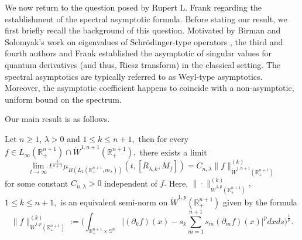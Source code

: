 \documentclass[12pt]{amsart}
\begin{document}
We now return to the question posed by Rupert L. Frank regarding the establishment of the spectral asymptotic formula. Before stating our result, we first briefly recall the background of this question. Motivated by Birman and Solomyak's work on eigenvalues of Schr\"{o}dinger-type operators \cite{MR1192782,MR279638}, the third and fourth authors and Frank \cite{FSZ} established the asymptotic of singular values for quantum derivatives (and thus, Riesz transform) in the classical setting. The spectral asymptotics are typically referred to as Weyl-type asymptotics. Moreover, the asymptotic coefficient happens to coincide with a non-asymptotic, uniform bound on the spectrum.

Our  main result is as follows.
\begin{theorem}\label{mtc} Let $n\geq1$, $\lambda>0$ and $1\leq k\leq n+1,$ then for every $f\in L_{\infty}(\mathbb{R}^{n+1}_+)\cap\dot{W}^{1,n+1}(\mathbb{R}^{n+1}_+),$ there exists a limit
$$\lim_{t\to\infty}t^{\frac1{n+1}}\mu_{B(L_2(\mathbb{R}^{n+1}_+,m_{\lambda}))}(t,[R_{\lambda,k},M_f])=C_{n,\lambda}\|f\|_{\dot{W}^{1,n+1}(\mathbb{R}_+^{n+1})}^{(k)}$$
for some constant $C_{n,\lambda}>0$ independent of $f.$ Here, $\|\cdot\|_{\dot{W}^{1,p}(\mathbb{R}_+^{n+1})}^{(k)},$ $1\leq k\leq n+1,$ is an equivalent semi-norm on $\dot{W}^{1,p}(\mathbb{R}_+^{n+1})$ given by the formula
$$\|f\|_{\dot{W}^{1,p}(\mathbb{R}_+^{n+1})}^{(k)}:=\Big(\int_{\mathbb{R}^{n+1}_+\times\mathbb{S}^n}\Big|(\partial_kf)(x)-s_k\sum_{m=1}^{n+1}s_m(\partial_mf)(x)\Big|^{p}dxds\Big)^{\frac1p}.$$
\end{theorem}
\end{document}
